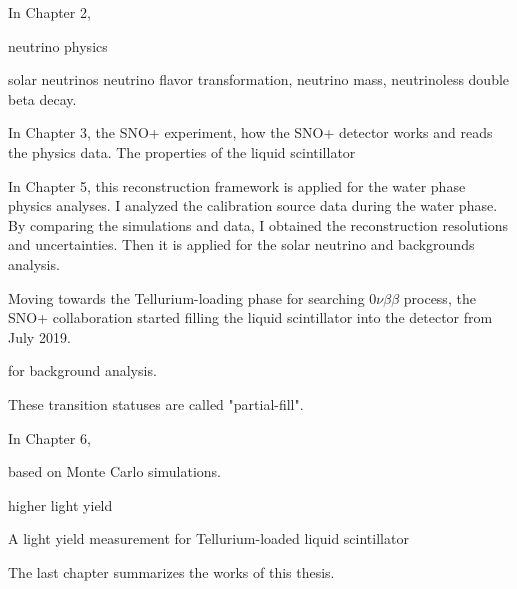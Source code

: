 In Chapter 2, 

neutrino physics

solar neutrinos
neutrino flavor transformation, neutrino mass, neutrinoless double beta decay.

In Chapter 3, the SNO+ experiment, how the SNO+ detector works and reads the physics data.
The properties of the liquid scintillator


In Chapter 5, this reconstruction framework is applied for the water phase physics analyses. I analyzed the calibration source data during the water phase. By comparing the simulations and data, I obtained the reconstruction resolutions and uncertainties. Then it is applied for the solar neutrino and backgrounds analysis.

Moving towards the Tellurium-loading phase for searching $0\nu\beta\beta$ process, the SNO+ collaboration started filling the liquid scintillator into the detector from July 2019. 

for background analysis.

These transition statuses are called "partial-fill".  

In Chapter 6, 

based on Monte Carlo simulations.

higher light yield

A light yield measurement for Tellurium-loaded liquid scintillator

The last chapter summarizes the works of this thesis.